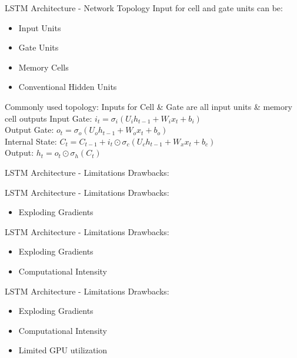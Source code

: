 \documentclass[10pt, aspectratio=169]{beamer}
\begin{document}
\begin{frame}[t]{LSTM Architecture - Network Topology}
Input for cell and gate units can be:
\begin{itemize}
    \item Input Units
    \item Gate Units
    \item Memory Cells
    \item Conventional Hidden Units
\end{itemize}
Commonly used topology: Inputs for Cell \& Gate are all input units \& memory cell outputs
Input Gate:  \begin{math}i_t=\sigma_i\left(U_{i}h_{t-1}+W_{i} x_t + b_i\right)\end{math}\\
Output Gate: \begin{math}o_t=\sigma_o\left(U_{o}h_{t-1}+W_{o}x_t + b_o\right)\end{math}\\
Internal State: \begin{math}C_t=C_{t-1}+i_t\odot\sigma_c\left(U_{c}h_{t-1}+W_{x}x_t + b_c\right)\end{math}\\
Output: \begin{math}h_t=o_t\odot\sigma_h\left(C_t\right)\end{math}
\end{frame}


\begin{frame}[t]{LSTM Architecture - Limitations}
Drawbacks:
\end{frame}

\begin{frame}[t]{LSTM Architecture - Limitations}
Drawbacks:
\begin{itemize}
    \item Exploding Gradients
\end{itemize}
\end{frame}

\begin{frame}[t]{LSTM Architecture - Limitations}
Drawbacks:
\begin{itemize}
    \item Exploding Gradients
    \item Computational Intensity
\end{itemize}
\end{frame}

\begin{frame}[t]{LSTM Architecture - Limitations}
Drawbacks:
\begin{itemize}
    \item Exploding Gradients
    \item Computational Intensity
    \item Limited GPU utilization
\end{itemize}
\end{frame}
\end{document}
